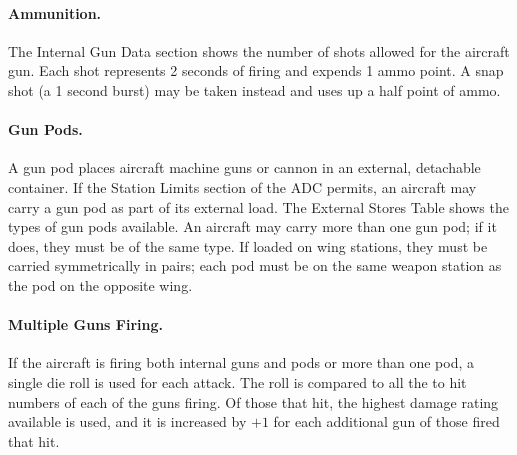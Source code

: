 \paragraph{Ammunition.} 
The Internal Gun Data section shows the number of shots allowed for the aircraft gun. Each shot represents 2 seconds of firing and expends 1 ammo point. A snap shot (a 1 second burst) may be taken instead and uses up a half point of ammo.

\paragraph{Gun Pods.} 
A gun pod places aircraft machine guns or cannon in an external, detachable container. If the Station Limits section of the ADC permits, an aircraft may carry a gun pod as part of its external load. The External Stores Table shows the types of gun pods available. An aircraft may carry more than one gun pod; if it does, they must be of the same type. If loaded on wing stations, they must be carried symmetrically in pairs; each pod must be on the same weapon station as the pod on the opposite wing.

\paragraph{Multiple Guns Firing.} 
If the aircraft is firing both internal guns and pods or more than one pod, a single die roll is used for each attack. The roll is compared to all the to hit numbers of each of the guns firing. Of those that hit, the highest damage rating available is used, and it is increased by $+1$ for each additional gun of those fired that hit.


